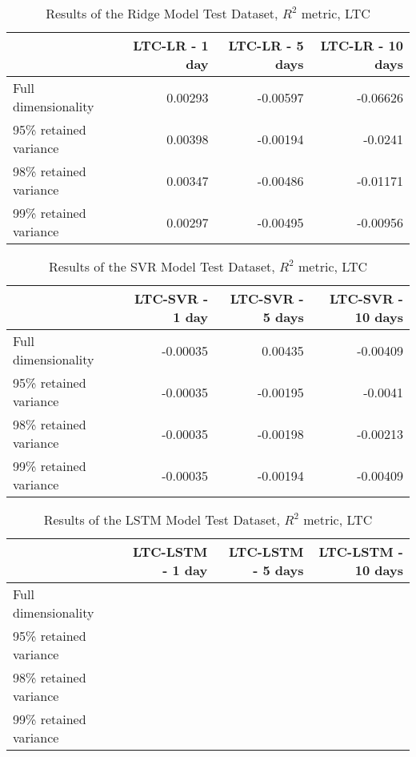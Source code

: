     \begin{table}[htbp]
        \centering
        \caption{Results of the Ridge Model Test Dataset, $R^2$ metric, LTC}
    \begin{tabular}{lrrr}
        \toprule
        {} &  LTC-LR - 1 day &  LTC-LR - 5 days &  LTC-LR - 10 days\\
        \midrule
        Full dimensionality   &    0.00293  &   -0.00597    &     -0.06626    \\
        95\% retained variance &   0.00398  &   -0.00194     &      -0.0241  \\
        98\% retained variance &    0.00347    &   -0.00486      &  -0.01171    \\
        99\% retained variance &   0.00297    &    -0.00495   &    -0.00956   \\
        \bottomrule
        \end{tabular}
    \end{table}
    
    \begin{table}[htbp]
        \centering
        \caption{Results of the SVR Model Test Dataset, $R^2$ metric, LTC}
    \begin{tabular}{lrrr}
        \toprule
        {} &  LTC-SVR - 1 day &  LTC-SVR - 5 days &  LTC-SVR - 10 days\\
        \midrule
        Full dimensionality     & -0.00035 &    0.00435    &    -0.00409     \\
        95\% retained variance   & -0.00035 &   -0.00195    &      -0.0041  \\
        98\% retained variance   & -0.00035  &      -0.00198   &    -0.00213      \\
        99\% retained variance   &  -0.00035 &    -0.00194     &    -0.00409    \\
        \bottomrule
    \end{tabular}
    \end{table}
    
    \begin{table}[htbp]
        \centering
        \caption{Results of the LSTM Model Test Dataset, $R^2$ metric, LTC}
    \begin{tabular}{lrrr}
        \toprule
        {} &  LTC-LSTM - 1 day &  LTC-LSTM - 5 days &  LTC-LSTM - 10 days \\
        \midrule
        Full dimensionality   &       &           &           \\
        95\% retained variance &       &           &            \\
        98\% retained variance &       &          &            \\
        99\% retained variance &      &       &           \\
        \bottomrule
    \end{tabular}
    \end{table}
    